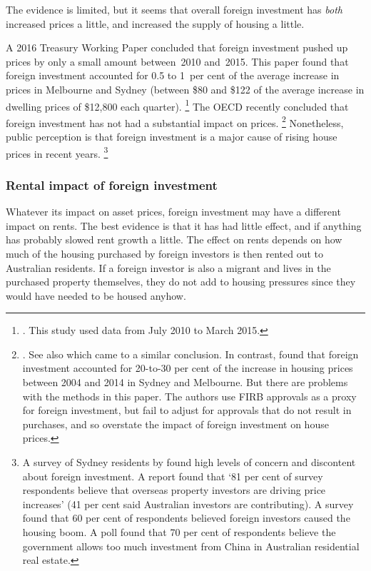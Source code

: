 The evidence is limited, but it seems that overall foreign investment has \emph{both} increased prices a little, and increased the supply of housing a little.

A 2016 Treasury Working Paper concluded that foreign investment pushed up prices by only a small amount between~2010 and~2015.
This paper found that foreign investment accounted for 0.5 to 1~per cent of the average increase in prices in Melbourne and Sydney (between \$80 and \$122 of the average increase in dwelling prices of \$12,800 each quarter).%
	\footnote{\textcite{Treasury2016Wokker}. This study used data from July 2010 to March 2015.}
The OECD recently concluded that foreign investment has not had a substantial impact on prices.%
    \footnote{\textcite[][29]{OECD2017c}. See also \textcite{GauderHoussardOrsmond} which came to a similar conclusion.
    In contrast, \textcite{AbacusGuestRohde} found that foreign investment accounted for 20-to-30 per cent of the increase in housing prices between 2004 and 2014 in Sydney and Melbourne.
    But there are problems with the methods in this paper.
    The authors use FIRB approvals as a proxy for foreign investment, but fail to adjust for approvals that do not result in purchases, and so overstate the impact of foreign investment on house prices.}
Nonetheless, public perception is that foreign investment is a major cause of rising house prices in recent years.%
    \footnote{A survey of Sydney residents by \textcite{RogersetalChineseRealEstate} found high levels of concern and discontent about foreign investment.
    A \textcite{McCrindleSydneyReport} report found that `81 per cent of survey respondents believe that overseas property investors are driving price increases' (41 per cent said Australian investors are contributing).
    A \textcite{DukeProperty} survey found that 60 per cent of respondents believed foreign investors caused the housing boom.
    A \textcite{LowyInstPoll} poll found that 70 per cent of respondents believe the government allows too much investment from China in Australian residential real estate.}

\subsubsection{Rental impact of foreign investment}\label{subsec:foreign-investment-rents}

Whatever its impact on asset prices, foreign investment may have a different impact on rents.
The best evidence is that it has had little effect, and if anything has probably slowed rent growth a little.
The effect on rents depends on how much of the housing purchased by foreign investors is then rented out to Australian residents.
If a foreign investor is also a migrant and lives in the purchased property themselves, they do not add to housing pressures since they would have needed to be housed anyhow.


